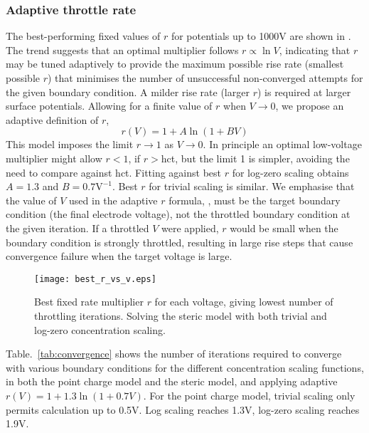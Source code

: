\subsubsection{Adaptive throttle rate}

The best-performing fixed values of $r$  for potentials up to 1000V are shown
in  . The trend suggests that an
optimal multiplier follows
$r \propto \ln V$, indicating that $r$ 
may be tuned adaptively to provide the maximum possible rise rate (smallest
possible $r$) that minimises the number of unsuccessful non-converged
attempts for the given boundary condition.  A milder
rise rate (larger $r$) is required at larger surface potentials.
Allowing for a finite value of $r$ when $V \rightarrow 0$, we propose
an adaptive definition of $r$,
\begin{equation}
  r(V) = 1 + A \ln(1 + B V)
  \label{adaptive_r}
\end{equation}
This model imposes the limit $r \rightarrow 1$ as $V \rightarrow 0$.
In principle an optimal low-voltage multiplier might allow $r<1$, if
$r>$hct, but the limit 1 is simpler, avoiding the need to 
compare against hct.  Fitting against best $r$ for log-zero scaling
obtains $A=1.3$ and $B=0.7 \textrm{V}^{-1}$. Best $r$ for trivial
scaling is similar.
We emphasise that the value of $V$ used in the adaptive $r$ formula, ,
must be the target boundary condition (the final electrode voltage),
not the throttled boundary condition at the given iteration.  If a throttled $V$ were
applied, $r$ would be small when the boundary condition is strongly
throttled, resulting in large rise steps that cause convergence
failure when the  target voltage is large.


\begin{figure}
\centering
\texttt{[image: best\_r\_vs\_v.eps]}
\caption{Best fixed rate multiplier $r$ for each voltage, giving lowest
  number of throttling iterations. Solving the steric model with both
  trivial and log-zero concentration scaling.
}
\label{fig:best_throttle_rate}
\end{figure}



Table.~\ref{tab:convergence} shows  the number of iterations required
to converge with various boundary conditions for the different
concentration scaling functions, in both the point charge model and the
steric model, and applying adaptive
$r(V)=1+1.3\ln(1+0.7V)$. For the point charge model, trivial scaling only
permits calculation up to 0.5V. Log scaling reaches 1.3V, log-zero
scaling reaches 1.9V.

